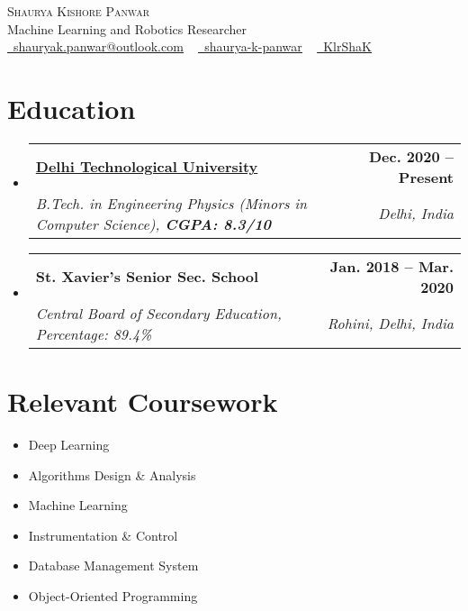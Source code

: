 \documentclass[letterpaper,11pt]{article}
\makeatletter
\newcommand{\resumeSubheading}[4]{
  \vspace{-2pt}\item
    \begin{tabular*}{1.0\textwidth}[t]{l@{\extracolsep{\fill}}r}
      \textbf{#1} & \textbf{\small #2} \\
      \textit{\small#3} & \textit{\small #4} \\
    \end{tabular*}\vspace{-7pt}
}
\newcommand{\resumeSubHeadingListStart}{\begin{itemize}[leftmargin=0.0in, label={}]}
\newcommand{\resumeSubHeadingListEnd}{\end{itemize}}
\makeatother
\begin{document}
\setlength{\footskip}{5pt}
\begin{center}
    {\Huge \scshape Shaurya Kishore Panwar} \\ \vspace{2pt}
    Machine Learning and Robotics Researcher \\ \vspace{3pt}
    \href{mailto:shauryak.panwar@outlook.com}{\raisebox{-0.2\height}\faEnvelope\  \underline{shauryak.panwar@outlook.com}} ~ 
    \href{https://linkedin.com/in/test/}{\raisebox{-0.2\height}\faLinkedin\ \underline{shaurya-k-panwar}}  ~
    \href{https://github.com/test}{\raisebox{-0.2\height}\faGithub\ \underline{KlrShaK}}
    \vspace{-8pt}
\end{center}


\section{Education}
  \resumeSubHeadingListStart
    \resumeSubheading
      {\href{http://dtu.ac.in/}{{Delhi Technological University}}}{Dec. 2020 -- Present}
      {B.Tech. in Engineering Physics (Minors in Computer Science), \textbf{CGPA: 8.3/10}}{Delhi, India}
    \resumeSubheading
      {St. Xavier's Senior Sec. School}{Jan. 2018 -- Mar. 2020}
      {Central Board of Secondary Education, Percentage: 89.4\%}{Rohini, Delhi, India}
  \resumeSubHeadingListEnd

\section{Relevant Coursework}
        \begin{multicols}{3}
            \begin{itemize}[itemsep=-5pt, parsep=3pt]
                \item Deep Learning
                \item Algorithms Design \& Analysis
                \item Machine Learning
                \item Instrumentation \& Control
                \item Database Management System
                \item Object-Oriented Programming
            \end{itemize}
        \end{multicols}
        \vspace*{2.0\multicolsep}
\end{document}
